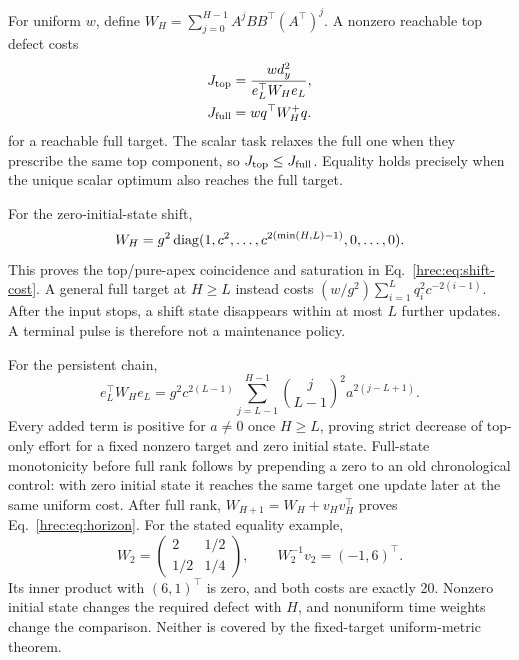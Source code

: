 For uniform \(w\), define \(W_H=\sum_{j=0}^{H-1}A^jBB^\top(A^\top)^j\). A nonzero reachable top defect costs
\[
 \begin{aligned}
 J_{\rm top}&=\frac{w d_y^2}{e_L^\top W_He_L},\\
 J_{\rm full}&=wq^\top W_H^+q.
 \end{aligned}
\]
for a reachable full target. The scalar task relaxes the full one when they prescribe the same top component, so \(J_{\rm top}\le J_{\rm full}\). Equality holds precisely when the unique scalar optimum also reaches the full target.

For the zero-initial-state shift,
\[
 W_H=g^2\operatorname{diag}(1,c^2,\ldots,
 c^{2(\min(H,L)-1)},0,\ldots,0).
\]
This proves the top/pure-apex coincidence and saturation in Eq.~\eqref{hrec:eq:shift-cost}. A general full target at \(H\ge L\) instead costs
\((w/g^2)\sum_{i=1}^Lq_i^2c^{-2(i-1)}\).
After the input stops, a shift state disappears within at most \(L\) further updates. A terminal pulse is therefore not a maintenance policy.

For the persistent chain,
\[
 e_L^\top W_He_L
 =g^2c^{2(L-1)}
 \sum_{j=L-1}^{H-1}\binom j{L-1}^2 a^{2(j-L+1)}.
\]
Every added term is positive for \(a\ne0\) once \(H\ge L\), proving strict decrease of top-only effort for a fixed nonzero target and zero initial state. Full-state monotonicity before full rank follows by prepending a zero to an old chronological control: with zero initial state it reaches the same target one update later at the same uniform cost. After full rank, \(W_{H+1}=W_H+v_Hv_H^\top\) proves Eq.~\eqref{hrec:eq:horizon}. For the stated equality example,
\[
 W_2=\begin{pmatrix}2&1/2\\1/2&1/4\end{pmatrix},
 \qquad W_2^{-1}v_2=(-1,6)^\top.
\]
Its inner product with \((6,1)^\top\) is zero, and both costs are exactly 20. Nonzero initial state changes the required defect with \(H\), and nonuniform time weights change the comparison. Neither is covered by the fixed-target uniform-metric theorem.

